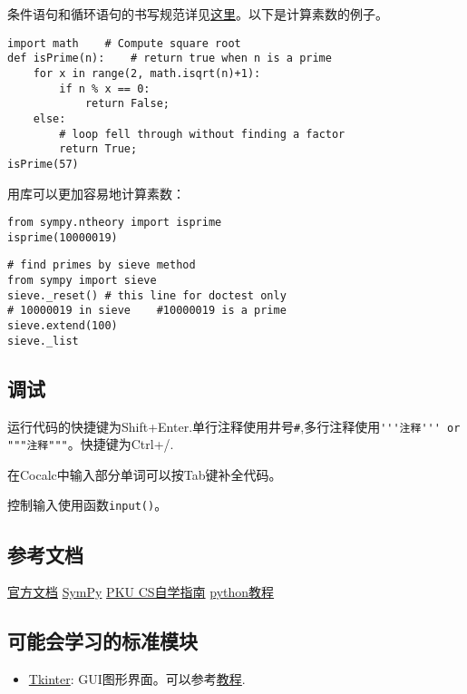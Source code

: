 \documentclass[11pt]{amsart}
\begin{document}
条件语句和循环语句的书写规范详见\href{https://docs.python.org/3/tutorial/controlflow.html}{这里}。以下是计算素数的例子。
\begin{lstlisting}[language=iPython]
import math    # Compute square root
def isPrime(n):    # return true when n is a prime
    for x in range(2, math.isqrt(n)+1):
        if n % x == 0:
            return False;
    else:
        # loop fell through without finding a factor
        return True;
isPrime(57)
\end{lstlisting}
用库可以更加容易地计算素数：
\begin{lstlisting}[language=iPython]
from sympy.ntheory import isprime
isprime(10000019)
\end{lstlisting}
\begin{lstlisting}[language=iPython]
# find primes by sieve method
from sympy import sieve
sieve._reset() # this line for doctest only
# 10000019 in sieve    #10000019 is a prime
sieve.extend(100)
sieve._list
\end{lstlisting}
\subsection{调试}
运行代码的快捷键为Shift+Enter.单行注释使用井号\lstinline|#|,多行注释使用\lstinline|'''注释''' or """注释"""|。快捷键为Ctrl+/.

在Cocalc中输入部分单词可以按Tab键补全代码。

控制输入使用函数\lstinline|input()|。

\subsection{参考文档}
\href{https://docs.python.org/zh-cn/3/tutorial/index.html}{官方文档}
\href{https://docs.sympy.org/latest/tutorial/index.html#tutorial}{SymPy}
\href{https://csdiy.wiki/}{PKU CS自学指南}
\href{https://www.pythontutorial.net/}{python教程}
\subsection{可能会学习的标准模块}
\begin{itemize}
\item \href{https://docs.python.org/3/library/tkinter.html}{Tkinter}: GUI图形界面。可以参考\href{https://www.pythontutorial.net/tkinter/}{教程}.
\end{itemize}
\end{document}
